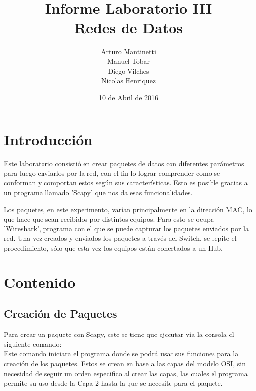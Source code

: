 ﻿\documentclass[spanish]{udpreport}
\title{Informe Laboratorio III \\ Redes de Datos}
\author{Arturo Mantinetti \\ Manuel Tobar \\ Diego Vilches \\ Nicolas Henriquez}
\date{10 de Abril de 2016} %
\begin{document}
\maketitle

\tableofcontents

\chapter{Introducción}

Este laboratorio consistió en crear paquetes de datos con diferentes parámetros para luego enviarlos por la red, con el fin lo lograr comprender como se conforman y comportan estos según sus características. Esto es posible gracias a un programa llamado 'Scapy' que nos da esas funcionalidades. 

Los paquetes, en este experimento, varían principalmente en la dirección MAC, lo que hace que sean recibidos por distintos equipos. Para esto se ocupa 'Wireshark', programa con el que se puede capturar los paquetes enviados por la red.  Una vez creados y enviados los paquetes a través del Switch, se repite el procedimiento, sólo que esta vez los equipos están conectados a un Hub. 



\chapter{Contenido}

\section{Creación de Paquetes}
Para crear un paquete con Scapy, este se tiene que ejecutar vía la consola el siguiente comando:
\\


Este comando iniciara el programa donde se podrá usar sus funciones para la creación de los paquetes. Estos se crean en base a las capas del modelo OSI, sin necesidad de seguir un orden especifico al crear las capas, las cuales el programa permite su uso desde la Capa 2 hasta la que se necesite para el paquete.
\end{document}
